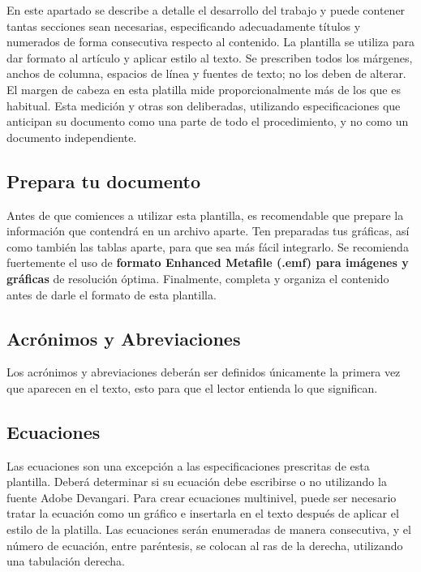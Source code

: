     En este apartado se describe a detalle el desarrollo del trabajo y puede contener tantas secciones sean necesarias, especificando adecuadamente títulos y numerados de forma consecutiva respecto al contenido.
    La plantilla se utiliza para dar formato al artículo y aplicar estilo al texto. 
    Se prescriben todos los márgenes, anchos de columna, espacios de línea y fuentes de texto; no los deben de alterar. 
    El margen de cabeza en esta platilla mide proporcionalmente más de los que es habitual. 
    Esta medición y otras son deliberadas, utilizando especificaciones que anticipan su documento como una parte de todo el procedimiento, y no como un documento independiente.
    
    \subsection{Prepara tu documento}
    
    Antes de que comiences a utilizar esta plantilla, es recomendable que prepare la información que contendrá en un archivo aparte. 
    Ten preparadas tus gráficas, así como también las tablas aparte, para que sea más fácil integrarlo. 
    Se recomienda fuertemente el uso de \textbf{formato Enhanced Metafile (.emf) para imágenes y gráficas} de resolución óptima. 
    Finalmente, completa y organiza el contenido antes de darle el formato de esta plantilla. 
    
    \subsection{Acrónimos y Abreviaciones}
    
    Los acrónimos y abreviaciones deberán ser definidos únicamente la primera vez que aparecen en el texto, esto para que el lector entienda lo que significan.
    
    \subsection{Ecuaciones}
    
    Las ecuaciones son una excepción a las especificaciones prescritas de esta plantilla. 
    Deberá determinar si su ecuación debe escribirse o no utilizando la fuente Adobe Devangari. 
    Para crear ecuaciones multinivel, puede ser necesario tratar la ecuación como un gráfico e insertarla en el texto después de aplicar el estilo de la platilla.
    Las ecuaciones serán enumeradas de manera consecutiva, y el número de ecuación, entre paréntesis, se colocan al ras de la derecha, utilizando una tabulación derecha. 
    
